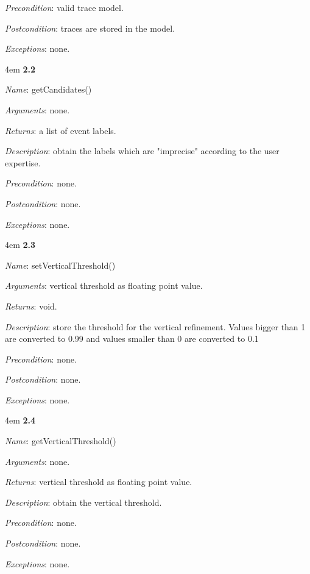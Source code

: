 \documentclass[notitlepage]{article}
\begin{document}
\begin{flushleft}
\textit{Precondition}: valid trace model.

\textit{Postcondition}: traces are stored in the model.

\textit{Exceptions}: none.

\par
\endgroup

\medskip


\par
\begingroup
\leftskip4em
\textbf{2.2} 

\textit{Name}: getCandidates()

\textit{Arguments}: none.

\textit{Returns}: a list of event labels.

\textit{Description}: obtain the labels which are "imprecise" according to the user expertise. 

\textit{Precondition}: none.

\textit{Postcondition}: none.

\textit{Exceptions}: none.
\par
\endgroup

\par
\begingroup
\leftskip4em
\textbf{2.3} 

\textit{Name}: setVerticalThreshold()

\textit{Arguments}: vertical threshold as floating point value.

\textit{Returns}: void.

\textit{Description}: store the threshold for the vertical refinement. Values bigger than 1 are converted to 0.99 and values smaller than 0 are converted to 0.1

\textit{Precondition}: none.

\textit{Postcondition}: none.

\textit{Exceptions}: none.
\par
\endgroup


\par
\begingroup
\leftskip4em
\textbf{2.4} 

\textit{Name}: getVerticalThreshold()

\textit{Arguments}: none.

\textit{Returns}: vertical threshold as floating point value.

\textit{Description}: obtain the vertical threshold.

\textit{Precondition}: none.

\textit{Postcondition}: none.

\textit{Exceptions}: none.
\par
\endgroup




\end{flushleft}
\end{document}
